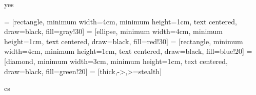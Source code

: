 \def\LangCS{cs}
\def\LangEN{en}
\def\IncludeExpr{yes}




\ifx\PackagesIncludeTikz\IncludeExpr
	\usepackage{memoize}
	\usepackage{collargs}
	\usepackage{tikz}
  \usepackage{tikz-cd}
  \usepackage{circuitikz}

  \usetikzlibrary{calc}
	\usetikzlibrary{fadings}
	\usetikzlibrary{shapes.geometric, arrows, positioning}

 = [rectangle, minimum width=4cm, minimum height=1cm, text centered, draw=black, fill=gray!30]
 = [ellipse, minimum width=4cm, minimum height=1cm, text centered, draw=black, fill=red!30]
 = [rectangle, minimum width=4cm, minimum height=1cm, text centered, draw=black, fill=blue!20]
 = [diamond, minimum width=3cm, minimum height=1cm, text centered, draw=black, fill=green!20]
 = [thick,->,>=stealth]
\fi




\ifx\DocLanguage\LangCS
  \usepackage[czech]{babel}
\else
  \usepackage[english]{babel}
\fi


\usepackage[T1]{fontenc}
\usepackage[utf8]{inputenc}
\usepackage{lmodern,textcomp}

\usepackage[a-2u]{pdfx}         %
\usepackage{graphicx}						%
\usepackage{caption}						%
\usepackage{subcaption} 				%
\usepackage{hyperref} 					%
\usepackage{tabularx}           %
\usepackage{xcolor,colortbl}    %
\usepackage{textpos}            %
\usepackage{longtable}          %
\usepackage{fancyhdr}						%
\usepackage{xurl}								%
\usepackage{enumitem}           %
\usepackage{multicol}           %


